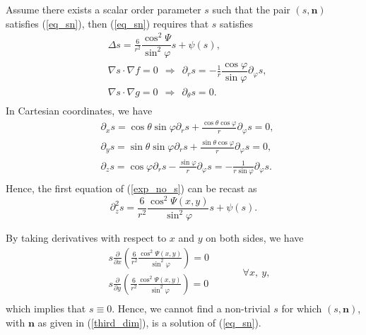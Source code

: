 \documentclass[10pt, a4paper]{article}
\newcommand\n{\mathbf{n}}
\newcommand\pp{\partial}
\begin{document}
Assume there exists a scalar order parameter $s$ such that the pair $(s, \n)$ satisfies (\ref{eq_sn}), then (\ref{eq_sn}) requires that $s$ satisfies 
\begin{equation}\label{exp_no_s}
\begin{aligned}
& \Delta s = \frac{6}{r^2} \dfrac{\cos^2 \Psi}{\sin^2 \varphi} s + \psi(s), \\ 
& \nabla s \cdot \nabla f = 0 ~~ \Rightarrow ~~ \pp_r s  = - \frac{1}{r} \dfrac{\cos \varphi}{\sin \varphi} \pp_{\varphi} s, \\
& \nabla s \cdot \nabla g = 0 ~~ \Rightarrow ~~ \pp_{\theta} s = 0. \\
\end{aligned}
\end{equation}
In Cartesian coordinates, we have
\begin{equation}
\begin{aligned}
& \pp_x s = \cos \theta \sin \varphi \pp_r s + \frac{\cos \theta \cos \varphi}{r} \pp_{\varphi} s = 0, \\
& \pp_y s = \sin \theta \sin \varphi \pp_r s + \frac{\sin \theta \cos \varphi}{r} \pp_{\varphi} s = 0, \\
& \pp_z s = \cos \varphi \pp_r s - \frac{\sin \varphi}{r} \pp_{\varphi} s = - \frac{1}{r \sin \varphi} \pp_{\varphi} s. \\
\end{aligned}
\end{equation}
Hence, the first equation of (\ref{exp_no_s}) can be recast as
\begin{equation}
\pp_z^2 s = \frac{6}{r^2} \frac{\cos^2 \Psi(x, y)}{\sin^2 \varphi} s + \psi(s). 
\end{equation}

By taking derivatives with respect to $x$ and $y$ on both sides, we have 
\begin{equation}
\begin{aligned}
& s \frac{\pp }{\pp x} \left(\frac{6}{r^2} \frac{\cos^2 \Psi(x, y)}{\sin^2 \varphi} \right) = 0  \\
& s \frac{\pp}{\pp y} \left( \frac{6}{r^2} \frac{\cos^2 \Psi(x, y)}{\sin^2 \varphi} \right) = 0 \\
\end{aligned}
\quad \quad \quad \forall x,~y, 
\end{equation}
which implies that $s \equiv 0$. Hence, we cannot find a non-trivial $s$ for which $(s, \n)$, with $\n$ as given in (\ref{third_dim}), is a solution of (\ref{eq_sn}).
\end{document}
